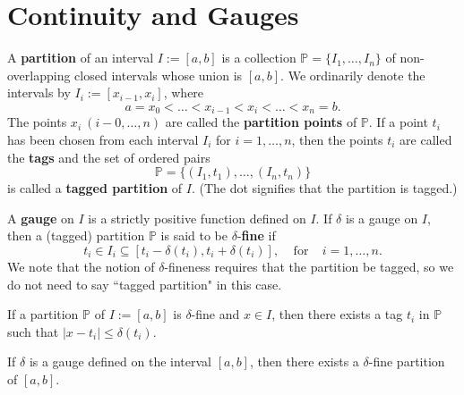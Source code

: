 \section{Continuity and Gauges}

\begin{definition}
	A \textbf{partition} of an interval $I := [a,b]$ is a collection $\mathbb{P} = \{I_1, \dots, I_n\}$ of non-overlapping closed intervals whose union is $[a,b]$. We ordinarily denote the intervals by $I_i:=[x_{i-1}, x_i]$, where
	\[a=x_0 < \dots < x_{i-1} < x_i < \dots < x_n = b.\]
	The points $x_i\ (i-0, \dots, n)$ are called the \textbf{partition points} of $\mathbb{P}$. If a point $t_i$ has been chosen from each interval $I_i$ for $i=1, \dots, n$, then the points $t_i$ are called the \textbf{tags} and the set of ordered pairs
	\[\mathbb{P} = \{(I_1, t_1), \dots, (I_n,t_n)\}\]
	is called a \textbf{tagged partition} of $I$. (The dot signifies that the partition is tagged.)
\end{definition}

\begin{definition}
	A \textbf{gauge} on $I$ is a strictly positive function defined on $I$. If $\delta$ is a gauge on $I$, then a (tagged) partition $\mathbb{P}$ is said to be $\delta$-\textbf{fine} if
	\[t_i \in I_i \subseteq [t_i - \delta(t_i), t_i + \delta(t_i)],\ \ \ \ \ \text{for}\ \ \ \ \ i=1, \dots, n.\]
	We note that the notion of $\delta$-fineness requires that the partition be tagged, so we do not need to say ``tagged partition" in this case.
\end{definition}

\begin{lemma}
	If a partition $\mathbb{P}$ of $I:=[a,b]$ is $\delta$-fine and $x \in I$, then there exists a tag $t_i$ in $\mathbb{P}$ such that $|x-t_i| \leq \delta (t_i)$.
\end{lemma}

\begin{theorem}
	If $\delta$ is a gauge defined on the interval $[a,b]$, then there exists a $\delta$-fine partition of $[a,b]$.
\end{theorem}
